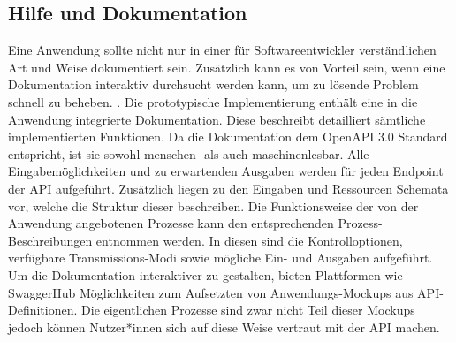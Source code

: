 \subsection{Hilfe und Dokumentation}
Eine Anwendung sollte nicht nur in einer für Softwareentwickler verständlichen Art und Weise dokumentiert sein. Zusätzlich kann es von Vorteil sein, wenn 
eine Dokumentation interaktiv durchsucht werden kann, um zu lösende Problem schnell zu beheben. \cite{usability_engineering,nielsen_poster,heuristics_website}.
Die prototypische Implementierung enthält eine in die Anwendung integrierte Dokumentation. Diese beschreibt detailliert sämtliche implementierten Funktionen. 
Da die Dokumentation dem OpenAPI 3.0 Standard entspricht, ist sie sowohl menschen- als auch maschinenlesbar. Alle Eingabemöglichkeiten und zu erwartenden 
Ausgaben werden für jeden Endpoint der API aufgeführt. Zusätzlich liegen zu den Eingaben und Ressourcen Schemata vor, welche die Struktur dieser beschreiben.
Die Funktionsweise der von der Anwendung angebotenen Prozesse kann den entsprechenden Prozess-Beschreibungen entnommen werden. In diesen sind die Kontrolloptionen, 
verfügbare Transmissions-Modi sowie mögliche Ein- und Ausgaben aufgeführt.
Um die Dokumentation interaktiver zu gestalten, bieten Plattformen wie SwaggerHub Möglichkeiten zum Aufsetzten von Anwendungs-Mockups aus API-Definitionen. 
Die eigentlichen Prozesse sind zwar nicht Teil dieser Mockups jedoch können Nutzer*innen sich auf diese Weise vertraut mit der API machen. 
  


